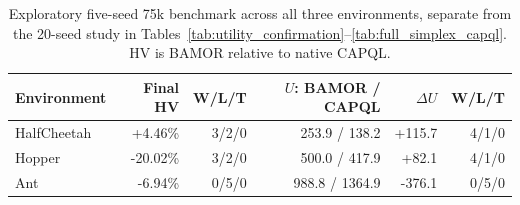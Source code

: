 \begin{table}[!htbp]
\centering\small\setlength{\tabcolsep}{4.5pt}
\caption{Exploratory five-seed 75k benchmark across all three environments, separate from the 20-seed study in Tables~\ref{tab:utility_confirmation}--\ref{tab:full_simplex_capql}. HV is BAMOR relative to native CAPQL.}
\label{tab:final_policy}
\begin{tabular}{@{}lrrrrr@{}}
\toprule
Environment & Final HV & W/L/T & $U$: BAMOR / CAPQL & $\Delta U$ & W/L/T \\
\midrule
HalfCheetah & +4.46\% & 3/2/0 & 253.9 / 138.2 & +115.7 & 4/1/0 \\
Hopper & -20.02\% & 3/2/0 & 500.0 / 417.9 & +82.1 & 4/1/0 \\
Ant & -6.94\% & 0/5/0 & 988.8 / 1364.9 & -376.1 & 0/5/0 \\
\bottomrule
\end{tabular}
\end{table}
